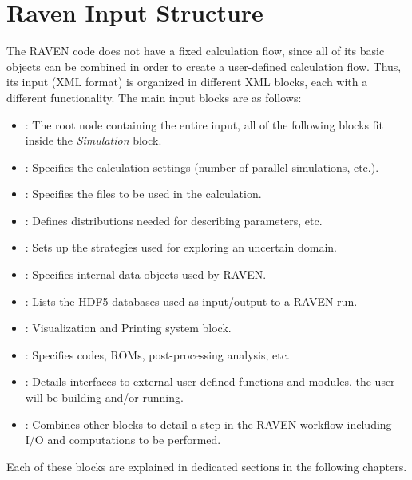 \section{Raven Input Structure}
The RAVEN code does not have a fixed calculation flow, since all of its basic
objects can be combined in order to create a user-defined calculation flow.
%
Thus, its input (XML format) is organized in different XML blocks, each with a
different functionality.
%
The main input blocks are as follows:
\begin{itemize}
  \item {}: The root node containing the
  entire input, all of
  the following blocks fit inside the \emph{Simulation} block.
  \item {}: Specifies the calculation
  settings (number of parallel simulations, etc.).
  \item {}: Specifies the files to be
  used in the calculation.
  \item {}: Defines distributions
  needed for describing parameters, etc.
  \item {}: Sets up the strategies used for
  exploring an uncertain domain.
  \item {}: Specifies internal data objects
  used by RAVEN.
  \item {}: Lists the HDF5 databases used
  as input/output to a
  RAVEN run.
  \item {}: Visualization and
  Printing system block.
  \item {}: Specifies codes, ROMs,
  post-processing analysis, etc.
  \item {}: Details interfaces to external
  user-defined functions and modules.
  the user will be building and/or running.
  \item {}: Combines other blocks to detail a
  step in the RAVEN workflow including I/O and computations to be performed.
\end{itemize}

Each of these blocks are explained in dedicated sections in the following
chapters.
%
